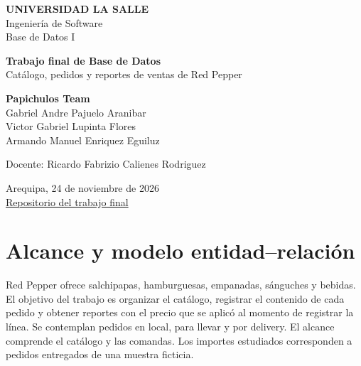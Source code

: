 \documentclass[12pt,a4paper]{article}
\newcommand{\repo}{https://github.com/Quetzalq4321q/trabajo-final-base-de-datos}
\begin{document}
\begin{titlepage}
\centering
{\large\bfseries UNIVERSIDAD LA SALLE}\\[3mm]
Ingeniería de Software\\
Base de Datos I

\vspace{25mm}
{\LARGE\bfseries Trabajo final de Base de Datos}\\[6mm]
{\Large Catálogo, pedidos y reportes de ventas de Red Pepper}

\vspace{22mm}
{\large\bfseries Papichulos Team}\\[3mm]
\ifdefined\InformePublico
\else
Gabriel Andre Pajuelo Aranibar\\
Victor Gabriel Lupinta Flores\\
Armando Manuel Enriquez Eguiluz

\vspace{10mm}
Docente: Ricardo Fabrizio Calienes Rodriguez
\fi

\vfill
Arequipa, 24 de noviembre de 2026\\
\href{\repo}{Repositorio del trabajo final}
\end{titlepage}

\section{Alcance y modelo entidad--relación}

Red Pepper ofrece salchipapas, hamburguesas, empanadas, sánguches y bebidas. El objetivo del trabajo es organizar el catálogo, registrar el contenido de cada pedido y obtener reportes con el precio que se aplicó al momento de registrar la línea. Se contemplan pedidos en local, para llevar y por delivery. El alcance comprende el catálogo y las comandas. Los importes estudiados corresponden a pedidos entregados de una muestra ficticia.
\end{document}
